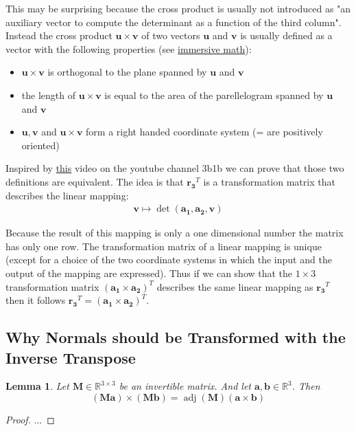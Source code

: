 \documentclass{article}
\newtheorem{lemma}{Lemma}
\newcommand{\R}{\mathbb{R}}
\newcommand{\vctr}[1]{\mathbf{#1}}
\newcommand{\mat}[1]{\mathbf{#1}}
\newcommand{\matCol}[1]{\vctr{a_{#1}}}
\DeclareMathOperator{\adj}{adj}
\begin{document}
This may be surprising because the cross product is usually not introduced as "an auxiliary vector to compute the determinant as a function of the third column". Instead the cross product \(\vctr{u} \times \vctr{v}\) of two vectors \(\vctr{u}\) and \(\vctr{v}\) is usually defined as a vector with the following properties (see \href{http://immersivemath.com/ila/ch04_vectorproduct/ch04.html#sec_vp_definition}{immersive math}):
\begin{itemize}
\item \(\vctr{u} \times \vctr{v}\) is orthogonal to the plane spanned by \(\vctr{u}\) and \(\vctr{v}\)
\item the length of \(\vctr{u} \times \vctr{v}\) is equal to the area of the parellelogram spanned by \(\vctr{u}\) and \(\vctr{v}\)
\item \(\vctr{u}, \vctr{v}\) and \(\vctr{u} \times \vctr{v}\) form a right handed coordinate system (= are positively oriented)
\end{itemize}

Inspired by \href{https://youtu.be/BaM7OCEm3G0}{this} video on the youtube channel 3b1b we can prove that those two definitions are equivalent.
The idea is that \(\vctr{r_3}^T\) is a transformation matrix that describes the linear mapping:
\begin{align*}
\vctr{v} \mapsto \det(\matCol{1}, \matCol{2}, \vctr{v})
\end{align*}

Because the result of this mapping is only a one dimensional number the matrix has only one row. 
The transformation matrix of a linear mapping is unique (except for a choice of the two coordinate systems in which the input and the output of the mapping are expressed). 
Thus if we can show that the \(1\times 3\) transformation matrix \((\matCol{1} \times \matCol{2})^T\) describes the same linear mapping as \(\vctr{r_3}^T\) then it follows \(\vctr{r_3}^T = (\matCol{1} \times \matCol{2})^T\).



\subsection{Why Normals should be Transformed with the Inverse Transpose}

\begin{lemma}
Let \(\mat{M} \in \R^{3\times 3}\) be an invertible matrix. And let \(\vctr{a}, \vctr{b} \in \R^3\). Then
\[
(\mat{M}\vctr{a})\times(\mat{M}\vctr{b}) = \adj(\mat{M}) (\vctr{a} \times \vctr{b})
\]
\end{lemma}
\begin{proof}
 ...
\end{proof}
\end{document}
